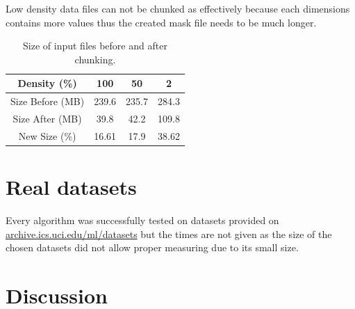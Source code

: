 Low density data files can not be chunked as effectively because each dimensions contains more values thus the created mask file needs to be much longer.

\begin{table}
\centering
\begin{tabular} {| c | c | c | c |}

\hline
Density (\%) & 100 & 50 & 2 \\
\hline
Size Before (MB) & 239.6 & 235.7 & 284.3 \\
\hline
Size After (MB) & 39.8 & 42.2 & 109.8 \\
\hline
\hline
New Size (\%) & 16.61 & 17.9 & 38.62  \\
\hline
\end{tabular}
\caption{Size of input files before and after chunking.}
\label{tab_chunk}
\end{table}

\section{Real datasets}
Every algorithm was successfully tested on datasets provided on \url{archive.ics.uci.edu/ml/datasets} but the times are not given as the size of the chosen datasets did not allow proper measuring due to its small size. %

\section{Discussion}

